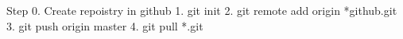 Step
0. Create repoistry in github
1. git init
2. git remote add origin *github.git
3. git push origin master 
4. git pull *.git
